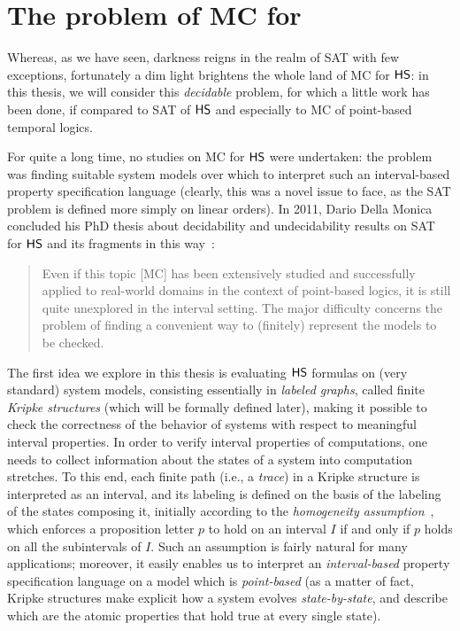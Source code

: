 \section{The problem of MC for \HS}

Whereas, as we have seen, darkness reigns in the realm of SAT with few exceptions,
fortunately a dim light brightens the whole land of MC for $\text{\sffamily HS}$:
in this thesis, we will consider this \emph{decidable} problem,
for which a little work has been done, if compared to SAT of $\text{\sffamily HS}$ and especially to MC of point-based temporal logics.

For quite a long time, no studies on MC for $\text{\sffamily HS}$ were undertaken: the problem was finding 
suitable system models over which to interpret such an interval-based property specification language 
(clearly, this was a novel issue to face, as the SAT problem is defined more simply on linear orders).
In 2011, Dario Della Monica concluded his PhD thesis about decidability and undecidability results on SAT for $\text{\sffamily HS}$ and its fragments in this way~\cite{DarioDM:phd_thesis}:
\begin{quote}
Even if this topic [MC] has been extensively studied and successfully applied to real-world domains in the context of point-based logics, it is still quite
unexplored in the interval setting. The major difficulty concerns the problem of finding a convenient way to (finitely) represent the models to be checked.
\end{quote}

The first idea we explore in this thesis is evaluating $\text{\sffamily HS}$ formulas on (very standard) system models, consisting essentially in \emph{labeled graphs}, called finite \emph{Kripke structures} (which will be formally defined later), making it
possible to check the correctness of the behavior of systems with respect to 
meaningful interval properties. 
In order to verify interval properties of computations, one needs to collect 
information about the states of a system into computation stretches.
To this end, each finite path (i.e., a \emph{trace}) in a Kripke structure is interpreted as an interval, 
and its labeling is defined on the basis of the labeling of the states composing it, initially
according to the \emph{homogeneity assumption}~\cite{Roe80}, which enforces a proposition letter $p$ to hold on an interval $I$ if and only if $p$ holds on all the subintervals of $I$.
Such an assumption is fairly natural for many applications; moreover, it easily enables us to 
interpret an \emph{interval-based} property specification language on a model which is \emph{point-based} (as a matter of fact, Kripke structures make explicit how a system evolves \emph{state-by-state}, and describe which are the atomic properties that hold true at every single state).


